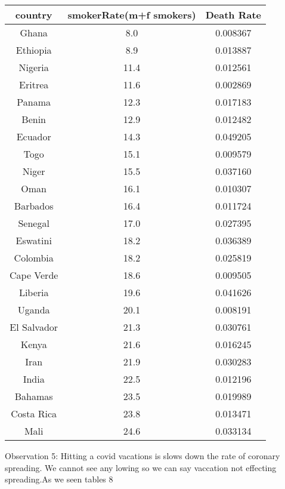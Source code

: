 \documentclass[a4 paper]{article}
\newcommand{\0}{\mathbf{0}}
\begin{document}
\begin{itemize}
\begin{table}[!ht]
\begin{tabular}{|c|c|c|}
        country & smokerRate(m+f smokers) & Death Rate\\\hline
        Ghana &  8.0 & 0.008367\\\hline
        Ethiopia &  8.9 & 0.013887\\\hline
        Nigeria & 11.4 & 0.012561\\\hline
        Eritrea & 11.6 & 0.002869\\\hline
        Panama & 12.3 & 0.017183\\\hline
        Benin & 12.9 & 0.012482\\\hline
        Ecuador & 14.3 & 0.049205\\\hline
        Togo & 15.1 & 0.009579\\\hline
        Niger & 15.5 & 0.037160\\\hline
        Oman & 16.1 & 0.010307\\\hline
        Barbados & 16.4 & 0.011724\\\hline
        Senegal & 17.0 & 0.027395\\\hline
        Eswatini & 18.2 & 0.036389\\\hline
        Colombia & 18.2 & 0.025819\\\hline
        Cape Verde & 18.6 & 0.009505\\\hline
        Liberia & 19.6 & 0.041626\\\hline
        Uganda & 20.1 & 0.008191\\\hline
        El Salvador & 21.3 & 0.030761\\\hline
        Kenya & 21.6 & 0.016245\\\hline
        Iran & 21.9 & 0.030283\\\hline
        India & 22.5 & 0.012196\\\hline
        Bahamas & 23.5 & 0.019989\\\hline
        Costa Rica & 23.8 & 0.013471\\\hline
        Mali & 24.6 & 0.033134\\\hline
	
	\end{tabular}
    \end{table}
    \newpage
    
    Observation 5:\newline
    Hitting a covid vacations is slows down the rate of coronary spreading.\newline
    We cannot see any lowing so we can say vaccation not effecting spreading.As we seen tables 8\newline


\end{itemize}
\end{document}
